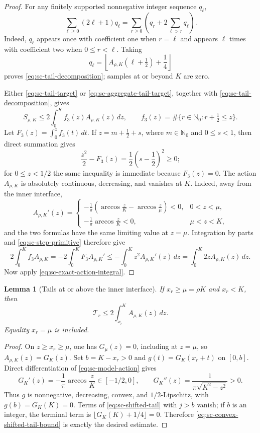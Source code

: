 \documentclass[11pt]{article}
\numberwithin{equation}{section}
\newtheorem{lemma}[theorem]{Lemma}
\theoremstyle{definition}
\theoremstyle{remark}
\begin{document}
\begin{proof}
For any finitely supported nonnegative integer sequence \(q_\ell\),
\[
  \sum_{\ell\ge0}(2\ell+1)q_\ell
  =\sum_{r\ge0}\left(q_r+2\sum_{\ell>r}q_\ell\right).
\]
Indeed, \(q_\ell\) appears once with coefficient one when \(r=\ell\) and
appears \(\ell\) times with coefficient two when \(0\le r<\ell\).  Taking
\[
  q_\ell=\left\lfloor
  A_{\rho,K}(\ell+\tfrac12)+\frac14\right\rfloor
\]
proves \eqref{eq:sc-tail-decomposition}; samples at or beyond \(K\) are
zero.

Either \eqref{eq:sc-tail-target} or
\eqref{eq:sc-aggregate-tail-target}, together with
\eqref{eq:sc-tail-decomposition}, gives
\[
  S_{\rho,K}
  \le2\int_0^K f_3(z)A_{\rho,K}(z)\,dz,
  \qquad
  f_3(z)=\#\{r\in\mathbb N_0:r+\tfrac12\le z\}.
\]
Let \(F_3(z)=\int_0^zf_3(t)\,dt\).  If
\(z=m+\tfrac12+s\), where \(m\in\mathbb N_0\) and \(0\le s<1\), then direct
summation gives
\begin{equation}
  \frac{z^2}{2}-F_3(z)
  =\frac12\left(s-\frac12\right)^2\ge0;
  \label{eq:sc-step-primitive}
\end{equation}
for \(0\le z<1/2\) the same inequality is immediate because \(F_3(z)=0\).
The action \(A_{\rho,K}\) is absolutely continuous, decreasing, and vanishes
at \(K\).  Indeed, away from the inner interface,
\[
  A_{\rho,K}'(z)=
  \begin{cases}
  \displaystyle-\frac1\pi\left(
  \arccos\frac zK-\arccos\frac z\mu\right)<0,
  &0<z<\mu,\\[2mm]
  \displaystyle-\frac1\pi\arccos\frac zK<0,
  &\mu<z<K,
  \end{cases}
\]
and the two formulas have the same limiting value at \(z=\mu\).
Integration by parts and \eqref{eq:sc-step-primitive} therefore
give
\[
  2\int_0^Kf_3A_{\rho,K}
  =-2\int_0^KF_3A_{\rho,K}'
  \le-\int_0^Kz^2A_{\rho,K}'(z)\,dz
  =\int_0^K2zA_{\rho,K}(z)\,dz.
\]
Now apply \eqref{eq:sc-exact-action-integral}.
\end{proof}

\begin{lemma}[Tails at or above the inner interface]
\label{lem:sc-high-interface-tails}
If \(x_r\ge\mu=\rho K\) and \(x_r<K\), then
\[
  \mathcal T_r\le2\int_{x_r}^{K}A_{\rho,K}(z)\,dz.
\]
Equality \(x_r=\mu\) is included.
\end{lemma}

\begin{proof}
On \(z\ge x_r\ge\mu\), one has \(G_\mu(z)=0\), including at \(z=\mu\),
so \(A_{\rho,K}(z)=G_K(z)\).  Set \(b=K-x_r>0\) and
\(g(t)=G_K(x_r+t)\) on \([0,b]\).  Direct differentiation of
\eqref{eq:sc-model-action} gives
\[
  G_K'(z)=-\frac1\pi\arccos\frac zK\in[-1/2,0],
  \qquad
  G_K''(z)=\frac1{\pi\sqrt{K^2-z^2}}>0.
\]
Thus \(g\) is nonnegative, decreasing, convex, and \(1/2\)-Lipschitz, with
\(g(b)=G_K(K)=0\).  Terms of \eqref{eq:sc-shifted-tail} with \(j>b\) vanish;
if \(b\) is an integer, the terminal term is
\(\lfloor G_K(K)+1/4\rfloor=0\).  Therefore
\eqref{eq:sc-convex-shifted-tail-bound} is exactly the desired estimate.
\end{proof}
\end{document}
